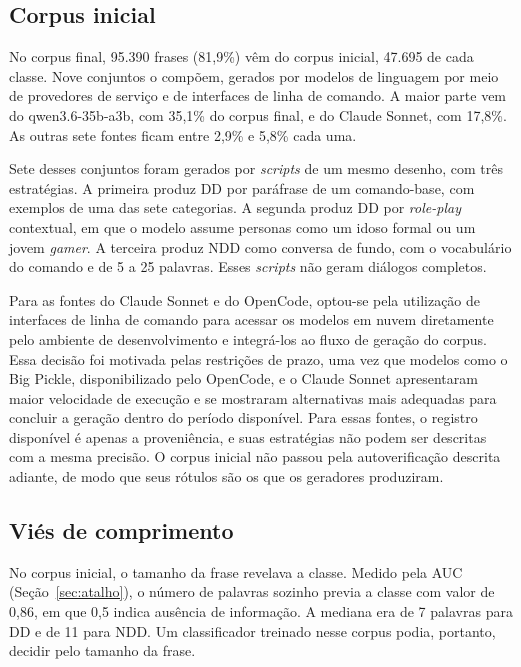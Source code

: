 \documentclass[
    12pt,                %
    openright,           %
    oneside,             %
    a4paper,             %
    english,             %
    brazil               %
]{abntex2}
\begin{document}

\subsection{Corpus inicial}
\label{sec:corpus_inicial}

No corpus final, 95.390 frases (81,9\%) vêm do corpus inicial, 47.695 de cada classe. Nove conjuntos o compõem, gerados por modelos de linguagem por meio de provedores de serviço e de interfaces de linha de comando. A maior parte vem do qwen3.6-35b-a3b, com 35,1\% do corpus final, e do Claude Sonnet, com 17,8\%. As outras sete fontes ficam entre 2,9\% e 5,8\% cada uma.

Sete desses conjuntos foram gerados por \textit{scripts} de um mesmo desenho, com três estratégias. A primeira produz DD por paráfrase de um comando-base, com exemplos de uma das sete categorias. A segunda produz DD por \textit{role-play} contextual, em que o modelo assume personas como um idoso formal ou um jovem \textit{gamer}. A terceira produz NDD como conversa de fundo, com o vocabulário do comando e de 5 a 25 palavras. Esses \textit{scripts} não geram diálogos completos.

Para as fontes do Claude Sonnet e do OpenCode, optou-se pela utilização de interfaces de linha de comando para acessar os modelos em nuvem diretamente pelo ambiente de desenvolvimento e integrá-los ao fluxo de geração do corpus. Essa decisão foi motivada pelas restrições de prazo, uma vez que modelos como o Big Pickle, disponibilizado pelo OpenCode, e o Claude Sonnet apresentaram maior velocidade de execução e se mostraram alternativas mais adequadas para concluir a geração dentro do período disponível. Para essas fontes, o registro disponível é apenas a proveniência, e suas estratégias não podem ser descritas com a mesma precisão. O corpus inicial não passou pela autoverificação descrita adiante, de modo que seus rótulos são os que os geradores produziram.


\subsection{Viés de comprimento}
\label{sec:vies_comprimento}

No corpus inicial, o tamanho da frase revelava a classe. Medido pela AUC (Seção~\ref{sec:atalho}), o número de palavras sozinho previa a classe com valor de 0,86, em que 0,5 indica ausência de informação. A mediana era de 7 palavras para DD e de 11 para NDD. Um classificador treinado nesse corpus podia, portanto, decidir pelo tamanho da frase.
\end{document}
